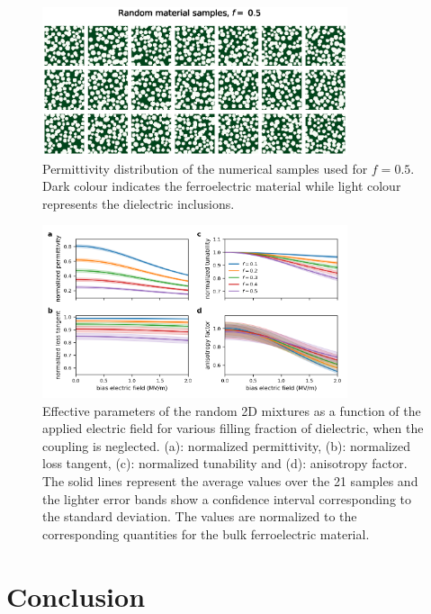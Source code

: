 \documentclass[%
 aip,
 amsmath,amssymb,
 reprint,%
]{revtex4-1}
\newcommand{\co}[1]{#1}
\begin{document}
%
\begin{figure}[h!]
 \centering
 \includegraphics[width=0.8\textwidth]{random_samples_f_50percent}
 \caption{Permittivity distribution of the numerical samples used for $f=0.5$. Dark
  colour indicates the ferroelectric material while light colour represents the
  dielectric inclusions.}
 \label{randmatepsi}
\end{figure}


\begin{figure}[h!]
 \centering
 \includegraphics[width=0.8\textwidth]{effpar_rand_uncpl}
 \caption{Effective parameters of the random 2D mixtures as a function of the
  applied electric field for various filling fraction of dielectric, when the
  coupling is neglected.
  (a): normalized permittivity, (b): normalized loss tangent, (c): normalized tunability and
  (d): anisotropy factor. The solid lines represent the average values
  over the 21 samples and the lighter error bands show a confidence interval corresponding to
  the standard deviation. \co{The values are normalized to the corresponding quantities for the bulk ferroelectric material.}}
 \label{eff_par_2Drand_TM_uncpl}
\end{figure}
%
\section{Conclusion}
\end{document}
